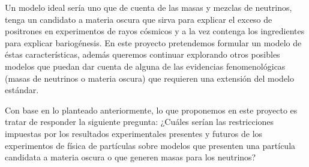 %



Un modelo ideal sería uno que de cuenta de las masas y mezclas de
neutrinos, tenga un candidato a materia oscura que sirva para explicar
el exceso de positrones en experimentos de rayos cósmicos y a la vez
contenga los ingredientes para explicar bariogénesis.  En este
proyecto pretendemos formular un modelo de éstas características,
además queremos continuar explorando otros posibles modelos que puedan
dar cuenta de alguna de las evidencias fenomenológicas (masas de
neutrinos o materia oscura) que requieren una extensión del modelo
estándar.


\begin{proyecto}
  Con base en lo planteado anteriormente, lo que proponemos en este
  proyecto es tratar de responder la siguiente pregunta: ¿Cuáles
  serían las restricciones impuestas por los resultados experimentales
  presentes y futuros de los experimentos de física de partículas
  sobre modelos que presenten una partícula candidata a materia oscura
  o que generen masas para los neutrinos?
\end{proyecto}
 



